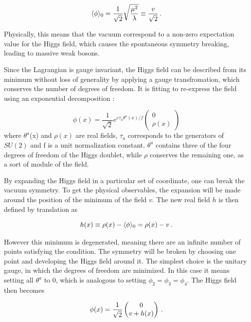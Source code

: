 \begin{equation}
    \langle \phi \rangle_0 = \frac{1}{\sqrt{2}}\sqrt{\frac{\mu^2}{\lambda}} \equiv \frac{v}{\sqrt{2}} \mend
\end{equation}

Physically, this means that the vacuum correspond to a non-zero expectation value for the Higgs field, which causes the spontaneous symmetry breaking, leading to massive weak bosons.

Since the Lagrangian is gauge invariant, the Higgs field can be described from its minimum without loss of generality by applying a gauge transfromation, which conserves the number of degrees of freedom. It is fitting to re-express the field using an exponential decomposition :

\begin{equation}
    \phi(x) = \frac{1}{\sqrt{2}}e^{e\tau_a \theta^a (x) / f} \begin{pmatrix} 0 \\ \rho(x) \end{pmatrix}
\end{equation}
where $\theta^a$(x) and $\rho(x)$ are real fields, $\tau_a$ corresponds to the generators of $SU(2)$ and f is a unit normalization constant. $\theta^a$ contains three of the four degrees of freedom of the Higgs doublet, while $\rho$ conserves the remaining one, as a sort of module of the field.\newline

By expanding the Higgs field in a particular set of coordinate, one can break the vacuum symmetry. To get the physical observables, the expansion will be made around the position of the minimum of the field $v$. The new real field $h$ is then defined by translation as

\begin{equation}
    h(x) \equiv \rho (x) - \langle \phi \rangle_0 = \rho(x) - v \mend
\end{equation}

However this minimum is degenerated, meaning there are an infinite number of points satisfying the condition. The symmetry will be broken by choosing one point and developing the Higgs field around it. The simplest choice is the unitary gauge, in which the degrees of freedom are minimized. In this case it means setting all $\theta^a$ to 0, which is analogous to setting $\phi_2 = \phi_3 = \phi_4$. The Higgs field then becomes

\begin{equation}
    \phi(x) = \frac{1}{\sqrt{2}} \begin{pmatrix} 0 \\ v + h(x) \end{pmatrix} \mend
    \label{eq:simphiggsfield}
\end{equation}

